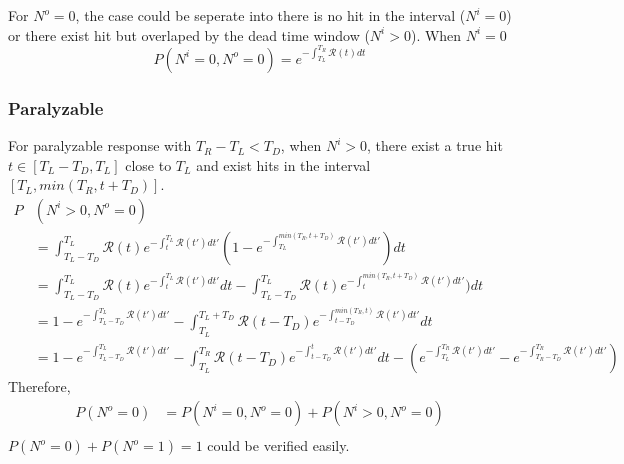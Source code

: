 For $N^o=0$, the case could be seperate into there is no hit in the interval ($N^i=0$) or there exist hit but overlaped by the dead time window ($N^i>0$). When $N^i=0$
\begin{equation}
P(N^i=0,N^o=0)=e^{-\int_{T_L}^{T_R}{\mathcal{R}(t)dt}}
\end{equation}
\subsubsection{Paralyzable}
For paralyzable response with $T_R-T_L<T_D$, when $N^i>0$, there exist a true hit $t\in[T_L-T_D,T_L]$ close to $T_L$ and exist hits in the interval $[T_L, min(T_R,t+T_D)]$.
\begin{equation}
\begin{aligned}
P&(N^i>0,N^o=0)\\
&=\int_{T_L-T_D}^{T_L}{\mathcal{R}(t)e^{-\int_{t}^{T_L}{\mathcal{R}(t')dt'}}(1-e^{-\int_{T_L}^{min(T_R,t+T_D)}{\mathcal{R}(t')dt'}})dt}\\
&=\int_{T_L-T_D}^{T_L}{\mathcal{R}(t)e^{-\int_{t}^{T_L}{\mathcal{R}(t')dt'}}dt}-\int_{T_L-T_D}^{T_L}{\mathcal{R}(t)e^{-\int_{t}^{min(T_R,t+T_D)}{\mathcal{R}(t')dt'}})dt}\\
&=1-e^{-\int_{T_L-T_D}^{T_L}{\mathcal{R}(t')dt'}}-\int_{T_L}^{T_L+T_D}{\mathcal{R}(t-T_D)e^{-\int_{t-T_D}^{min(T_R,t)}{\mathcal{R}(t')dt'}}dt}\\
&=1-e^{-\int_{T_L-T_D}^{T_L}{\mathcal{R}(t')dt'}}-\int_{T_L}^{T_R}{\mathcal{R}(t-T_D)e^{-\int_{t-T_D}^{t}{\mathcal{R}(t')dt'}}dt} -(e^{-\int_{T_L}^{T_R}{\mathcal{R}(t')dt'}}-e^{-\int_{T_R-T_D}^{T_R}{\mathcal{R}(t')dt'}})
\end{aligned}
\end{equation}
Therefore, 
\begin{equation}
\begin{aligned}
P(N^o=0) &= P(N^i=0,N^o=0)+P(N^i>0,N^o=0)\\
\end{aligned}
\end{equation}
$P(N^o=0)+P(N^o=1)=1$ could be verified easily.

